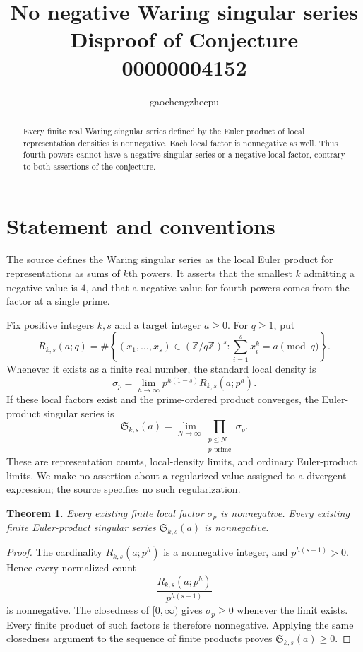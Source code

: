 \documentclass[11pt]{article}
\title{No negative Waring singular series\\\large Disproof of Conjecture 00000004152}
\author{gaochengzhecpu}
\date{}
\newtheorem{theorem}{Theorem}
\begin{document}
\maketitle
\begin{abstract}
Every finite real Waring singular series defined by the Euler product of local representation densities is nonnegative. Each local factor is nonnegative as well. Thus fourth powers cannot have a negative singular series or a negative local factor, contrary to both assertions of the conjecture.
\end{abstract}

\section*{Statement and conventions}
The source defines the Waring singular series as the local Euler product for representations as sums of $k$th powers. It asserts that the smallest $k$ admitting a negative value is $4$, and that a negative value for fourth powers comes from the factor at a single prime.

Fix positive integers $k,s$ and a target integer $a\geq0$. For $q\geq1$, put
\[
 R_{k,s}(a;q)=\#\left\{(x_1,\ldots,x_s)\in(\mathbb Z/q\mathbb Z)^s:
  \sum_{i=1}^{s}x_i^k=a\pmod q\right\}.
\]
Whenever it exists as a finite real number, the standard local density is
\[
 \sigma_p=\lim_{h\to\infty}p^{h(1-s)}R_{k,s}(a;p^h).
\]
If these local factors exist and the prime-ordered product converges, the Euler-product singular series is
\[
 \mathfrak S_{k,s}(a)=\lim_{N\to\infty}
       \prod_{\substack{p\leq N\\p\text{ prime}}}\sigma_p.
\]
These are representation counts, local-density limits, and ordinary Euler-product limits. We make no assertion about a regularized value assigned to a divergent expression; the source specifies no such regularization.

\begin{theorem}
Every existing finite local factor $\sigma_p$ is nonnegative. Every existing finite Euler-product singular series $\mathfrak S_{k,s}(a)$ is nonnegative.
\end{theorem}
\begin{proof}
The cardinality $R_{k,s}(a;p^h)$ is a nonnegative integer, and $p^{h(s-1)}>0$. Hence every normalized count
\[
 \frac{R_{k,s}(a;p^h)}{p^{h(s-1)}}
\]
is nonnegative. The closedness of $[0,\infty)$ gives $\sigma_p\geq0$ whenever the limit exists. Every finite product of such factors is therefore nonnegative. Applying the same closedness argument to the sequence of finite products proves $\mathfrak S_{k,s}(a)\geq0$.
\end{proof}
\end{document}
